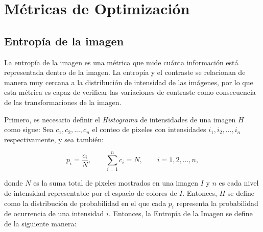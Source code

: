 \section{Métricas de Optimización}

\subsection{Entropía de la imagen}

La entropía de la imagen \cite{108593} es una métrica que mide cuánta información está representada dentro de la imagen. La entropía y el contraste se relacionan de manera muy cercana a la distribución de intensidad de las imágenes, por lo que esta métrica es capaz de verificar las variaciones de contraste como consecuencia de las transformaciones de la imagen.


Primero, es necesario definir el \textit{Histograma} de intensidades de una imagen $H$ como sigue: Sea $c_1, c_2, ..., c_n$ el conteo de pixeles con intensidades $i_1, i_2, ..., i_n$ respectivamente, y sea también:


\begin{equation}
p_i=\frac{c_i}{N}, \qquad \sum_{i=1}^n c_i = N, \qquad i= 1,2, ..., n,
\end{equation}

donde $N$ es la suma total de pixeles mostrados en una imagen $I$ y $n$ es cada nivel de intensidad representable por el espacio de colores de $I$. Entonces, $H$ se define como la distribución de probabilidad en el que cada $p_i$ representa la probabilidad de ocurrencia de una intensidad $i$. Entonces, la Entropía de la Imagen se define de la siguiente manera:


